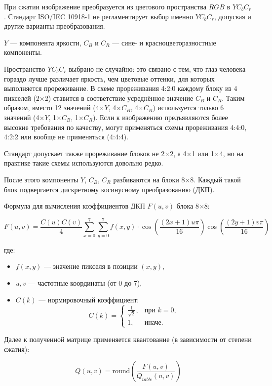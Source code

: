 \documentclass[12pt]{article}
\begin{document}
При сжатии изображение преобразуется из цветового пространства $RGB$ в $YC_{b}C_{r}$.
Стандарт ISO/IEC 10918-1 не регламентирует выбор именно $YC_{b}C_{r}$,
допуская и другие варианты преобразования.

$Y$ — компонента яркости, $C_{B}$ и $C_{R}$ — сине- и красноцветоразностные компоненты.

Пространство $YC_{b}C_{r}$ выбрано не случайно: это связано с тем, что глаз человека гораздо лучше
различает яркость, чем цветовые оттенки, для которых выполняется прореживание.
В схеме прореживания 4:2:0 каждому блоку из 4 пикселей (2×2) ставится в соответствие
усреднённое значение $C_{B}$ и $C_{R}$.
Таким образом, вместо 12 значений (4×$Y$, 4×$C_{B}$, 4×$C_{R}$)
используется только 6 значений (4×$Y$, 1×$C_{B}$, 1×$C_{R}$).
Если к изображению предъявляются более высокие требования по качеству,
могут применяться схемы прореживания 4:4:0, 4:2:2 или вообще не применяться (4:4:4).

Стандарт допускает также прореживание блоков не 2×2, а 4×1 или 1×4,
но на практике такие схемы используются довольно редко.

После этого компоненты $Y$, $C_{B}$, $C_{R}$ разбиваются на блоки 8×8.
Каждый такой блок подвергается дискретному косинусному преобразованию (ДКП).

Формула для вычисления коэффициентов ДКП $F(u,v)$ блока 8×8:

\[
    F(u,v) = \frac{C(u)C(v)}{4} \sum_{x=0}^{7} \sum_{y=0}^{7} f(x,y) \cdot \cos\left(\frac{(2x+1)u\pi}{16}\right) \cos\left(\frac{(2y+1)v\pi}{16}\right)
\]

где:
\begin{itemize}
    \item $f(x,y)$ — значение пикселя в позиции $(x,y)$,
    \item $u,v$ — частотные координаты (от 0 до 7),
    \item $C(k)$ — нормировочный коэффициент:
          \[
              C(k) = \begin{cases}
                  \frac{1}{\sqrt{2}}, & \text{при } k=0, \\
                  1,                  & \text{иначе}.
              \end{cases}
          \]
\end{itemize}

Далее к полученной матрице применяется квантование (в зависимости от степени сжатия):

\[
    Q(u, v) = \text{round}\left(\frac{F(u, v)}{Q_{table}(u, v)}\right)
\]
\end{document}
